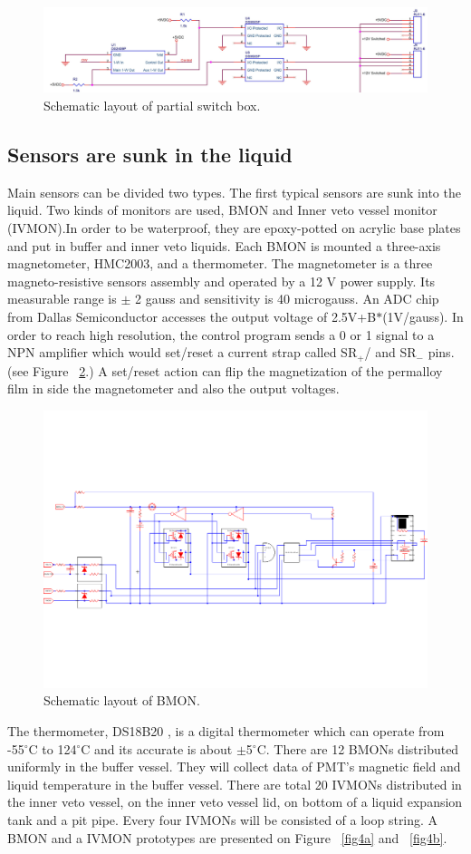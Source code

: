 \documentclass{JINST}
\begin{document}
\begin{figure}[h]
\centering
\includegraphics[width=.6\textwidth]{switchbox.jpg}
\caption{Schematic layout of partial switch box.}
\label{fig2}
\end{figure}
\subsection{Sensors are sunk in the liquid}
Main sensors can be divided two types. The first typical sensors are sunk into the liquid. Two kinds of monitors are used, BMON and Inner veto vessel monitor (IVMON).In order to be waterproof, they are epoxy-potted on acrylic base plates and put in buffer and inner veto liquids. Each BMON is mounted a three-axis magnetometer, HMC2003,\cite{bib7} and a thermometer. The magnetometer is a three magneto-resistive sensors assembly and operated by a 12 V power supply. Its measurable range is $\pm$ 2 gauss and sensitivity is 40 microgauss. An ADC chip from Dallas Semiconductor accesses the output voltage of 2.5V+B$\ast$(1V/gauss). In order to reach high resolution, the control program sends a 0 or 1 signal to a NPN amplifier which would set/reset a current strap called SR$_{+}$/ and SR$_{-}$ pins. (see Figure ~\ref{fig3}.) A set/reset action can flip the magnetization of the permalloy film in side the magnetometer and also the output voltages.\cite{bib8}

\begin{figure}
\centering
\includegraphics[width=.6\textwidth]{bmon_schematic.png}
\caption{Schematic layout of BMON.}
\label{fig3}
\end{figure}
The thermometer, DS18B20 \cite{bib6}, is a digital thermometer which can operate from -55$^\circ$C to 124$^\circ$C and its accurate is about $\pm$5$^\circ$C. There are 12 BMONs distributed uniformly in the buffer vessel. They will collect data of PMT\textquoteright s magnetic field and liquid temperature in the buffer vessel. There are total 20 IVMONs distributed in the inner veto vessel, on the inner veto vessel lid, on bottom of a liquid expansion tank and a pit pipe. Every four IVMONs will be consisted of a loop string. A BMON and a IVMON prototypes are presented on Figure ~\ref{fig4a} and ~\ref{fig4b}.
\end{document}
